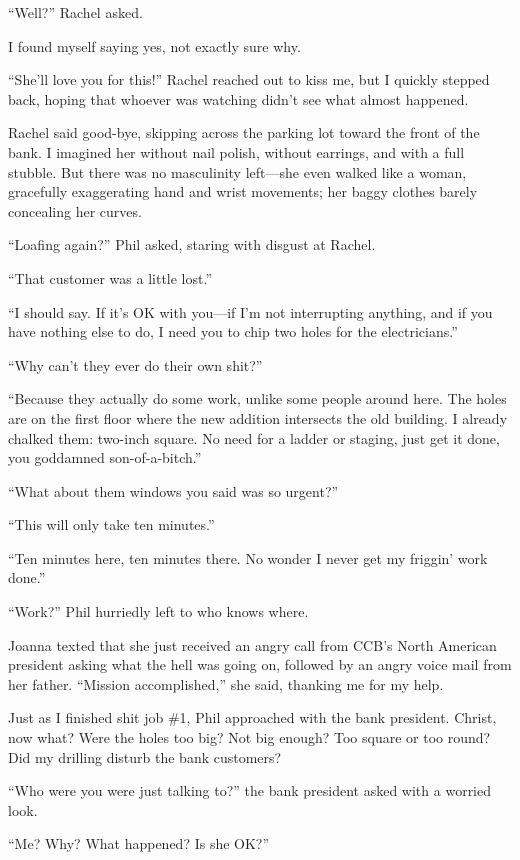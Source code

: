 \noindent ``Well?'' Rachel asked.

I found myself saying yes, not exactly sure why.

``She'll love you for this!'' Rachel reached out to kiss me, but I
quickly stepped back, hoping that whoever was watching didn't see what
almost happened.

Rachel said good-bye, skipping across the parking lot toward the front
of the bank. I imagined her without nail polish, without earrings, and
with a full stubble. But there was no masculinity left---she even walked
like a woman, gracefully exaggerating hand and wrist movements; her
baggy clothes barely concealing her curves.

``Loafing again?'' Phil asked, staring with disgust at Rachel.

``That customer was a little lost.''

``I should say. If it's OK with you---if I'm not interrupting anything,
and if you have nothing else to do, I need you to chip two holes for the
electricians.''

``Why can't they ever do their own shit?''

``Because they actually do some work, unlike some people around here.
The holes are on the first floor where the new addition intersects the
old building. I already chalked them: two-inch square. No need for a
ladder or staging, just get it done, you goddamned son-of-a-bitch.''

``What about them windows you said was so urgent?''

``This will only take ten minutes.''

``Ten minutes here, ten minutes there. No wonder I never get my friggin'
work done.''

``Work?'' Phil hurriedly left to who knows where.

Joanna texted that she just received an angry call from CCB's North
American president asking what the hell was going on, followed by an
angry voice mail from her father. ``Mission accomplished,'' she said,
thanking me for my help.

Just as I finished shit job \#1, Phil approached with the bank
president. Christ, now what? Were the holes too big? Not big enough? Too
square or too round? Did my drilling disturb the bank customers?

``Who were you were just talking to?'' the bank president asked with a
worried look.

``Me? Why? What happened? Is she OK?''

